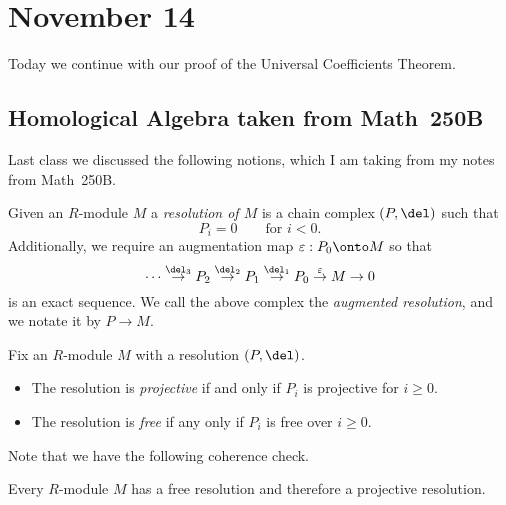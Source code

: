 \documentclass[../notes.tex]{subfiles}
\begin{document}
\section{November 14}

Today we continue with our proof of the Universal Coefficients Theorem.

\subsection{Homological Algebra taken from Math~250B}
Last class we discussed the following notions, which I am taking from my notes from Math~250B.
\begin{definition}[resolution] \label{def:resolution}
	Given an $R$-module $M$ a \textit{resolution of $M$} is a chain complex $(P,\del)$ such that
	\[P_i=0\qquad\text{for }i<0.\]
	Additionally, we require an augmentation map $\varepsilon:P_0\onto M$ so that
	\[\cdots\stackrel{\del_3}\to P_2\stackrel{\del_2}\to P_1\stackrel{\del_1}\to P_0\stackrel{\varepsilon}\to M\to 0\]
	is an exact sequence. We call the above complex the \textit{augmented resolution}, and we notate it by $P\to M$.
\end{definition}
\begin{defi}
	Fix an $R$-module $M$ with a resolution $(P,\del)$.
	\begin{itemize}
		\item The resolution is \textit{projective} if and only if $P_i$ is projective for $i\ge0$.
		\item The resolution is \textit{free} if any only if $P_i$ is free over $i\ge0$.
	\end{itemize}
\end{defi}
Note that we have the following coherence check.
\begin{lemma} \label{lem:enoughprojectives}
	Every $R$-module $M$ has a free resolution and therefore a projective resolution.
\end{lemma}
\end{document}
